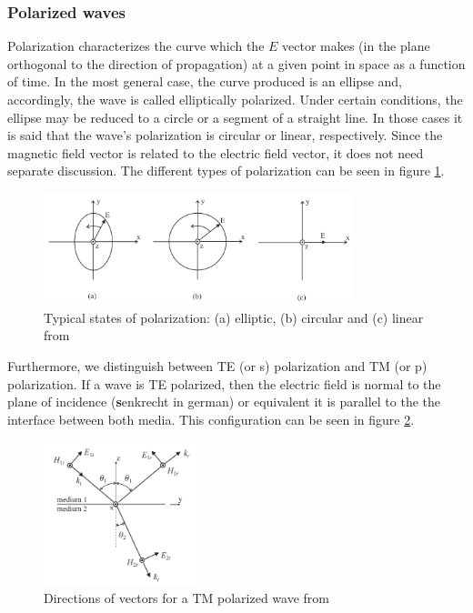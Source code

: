 \subsubsection{Polarized waves}

Polarization characterizes the curve which the $E$ vector makes (in the plane orthogonal to the direction of propagation) at a given point in space as a function of time. In the most general case, the curve produced is an ellipse and, accordingly, the wave is called elliptically polarized. Under certain conditions, the ellipse may be reduced to a circle or a segment of a straight line. In those cases it is said that the wave’s polarization is circular or linear, respectively. Since the magnetic field vector is related to the electric field vector, it does not need separate discussion. The different types of polarization can be seen in figure \ref{fig:Polarization}.

\begin{figure}[h!]
    \centering
    \includegraphics[width=0.8\textwidth]{figures/Polarization.png}
    \caption{Typical states of polarization: (a) elliptic, (b) circular and (c) linear from \cite{wartak2013computational}}
    \label{fig:Polarization}
\end{figure}

Furthermore, we distinguish between TE (or s) polarization and TM (or p) polarization. If a wave is TE polarized, then the electric field is normal to the plane of incidence (\textbf{s}enkrecht in german) or equivalent it is parallel to the the interface between both media. This configuration can  be seen in figure \ref{fig:TMPolarization}.

\begin{figure}[h!]
    \centering
    \includegraphics[width=0.4\textwidth]{figures/TMPolarization.png}
    \caption{Directions of vectors for a TM polarized wave from \cite{wartak2013computational}}
    \label{fig:TMPolarization}
\end{figure}


